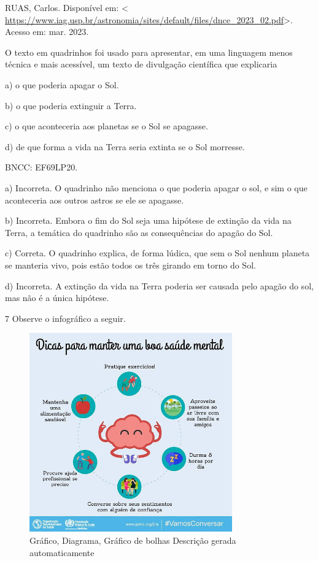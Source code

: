 RUAS, Carlos. Disponível em: \textless{}
\url{https://www.iag.usp.br/astronomia/sites/default/files/dnce_2023_02.pdf}\textgreater.
Acesso em: mar. 2023.

O texto em quadrinhos foi usado para apresentar, em uma linguagem menos
técnica e mais acessível, um texto de divulgação científica que
explicaria

a) o que poderia apagar o Sol.

b) o que poderia extinguir a Terra.

c) o que aconteceria aos planetas se o Sol se apagasse.

d) de que forma a vida na Terra seria extinta se o Sol morresse.

BNCC: EF69LP20.

a) Incorreta. O quadrinho não menciona o que poderia apagar o sol, e sim
o que aconteceria aos outros astros se ele se apagasse.

b) Incorreta. Embora o fim do Sol seja uma hipótese de extinção da vida
na Terra, a temática do quadrinho são as consequências do apagão do Sol.

c) Correta. O quadrinho explica, de forma lúdica, que sem o Sol nenhum
planeta se manteria vivo, pois estão todos os três girando em torno do
Sol.

d) Incorreta. A extinção da vida na Terra poderia ser causada pelo
apagão do sol, mas não é a única hipótese.

\num{7} Observe o infográfico a seguir.

\begin{figure}
\centering
\includegraphics[width=3.43333in,height=3.37681in]{./imgSAEB_6_POR/media/image15.jpeg}
\caption{Gráfico, Diagrama, Gráfico de bolhas Descrição gerada
automaticamente}
\end{figure}

